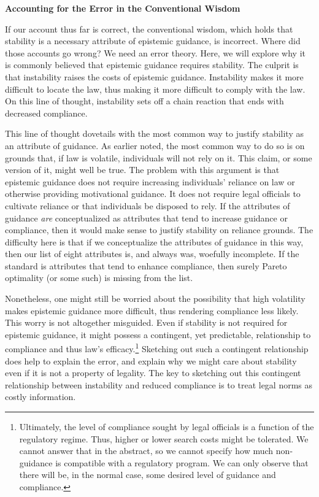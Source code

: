 \textbf{Accounting for the Error in the Conventional Wisdom }

If our account thus far is correct, the conventional wisdom, which holds
that stability is a necessary attribute of epistemic guidance, is
incorrect. Where did those accounts go wrong? We need an error theory.
Here, we will explore why it is commonly believed that epistemic
guidance requires stability. The culprit is that instability raises the
costs of epistemic guidance. Instability makes it more difficult to
locate the law, thus making it more difficult to comply with the law. On
this line of thought, instability sets off a chain reaction that ends
with decreased compliance.

This line of thought dovetails with the most common way to justify
stability as an attribute of guidance. As earlier noted, the most common
way to do so is on grounds that, if law is volatile, individuals will
not rely on it. This claim, or some version of it, might well be true.
The problem with this argument is that epistemic guidance does not
require increasing individuals' reliance on law or otherwise providing
motivational guidance. It does not require legal officials to cultivate
reliance or that individuals be disposed to rely. If the attributes of
guidance \emph{are} conceptualized as attributes that tend to increase
guidance or compliance, then it would make sense to justify stability on
reliance grounds. The difficulty here is that if we conceptualize the
attributes of guidance in this way, then our list of eight attributes
is, and always was, woefully incomplete. If the standard is attributes
that tend to enhance compliance, then surely Pareto optimality (or some
such) is missing from the list.

Nonetheless, one might still be worried about the possibility that high
volatility makes epistemic guidance more difficult, thus rendering
compliance less likely. This worry is not altogether misguided. Even if
stability is not required for epistemic guidance, it might possess a
contingent, yet predictable, relationship to compliance and thus law's
efficacy.\footnote{Ultimately, the level of compliance sought by legal
  officials is a function of the regulatory regime. Thus, higher or
  lower search costs might be tolerated. We cannot answer that in the
  abstract, so we cannot specify how much non-guidance is compatible
  with a regulatory program. We can only observe that there will be, in
  the normal case, some desired level of guidance and compliance.}
Sketching out such a contingent relationship does help to explain the
error, and explain why we might care about stability even if it is not a
property of legality. The key to sketching out this contingent
relationship between instability and reduced compliance is to treat
legal norms as costly information.

